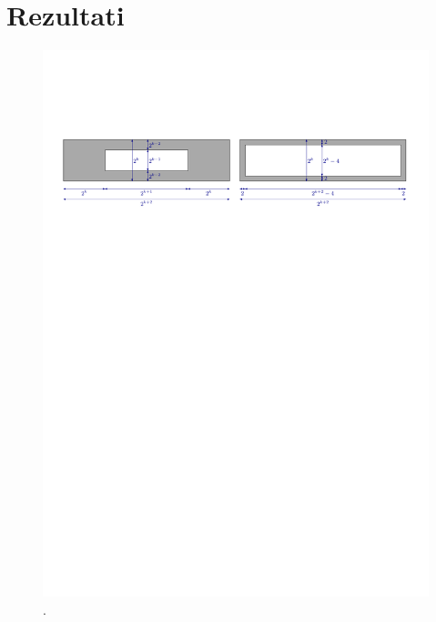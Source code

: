 \documentclass[a4paper, 12pt]{book}
\begin{document}
\chapter{Rezultati}
\label{ch3}

\begin{figure}
\centerline{\includegraphics[scale=0.75, page=1]{pics/data_generation.pdf}}
\caption{. }
\label{generation}
\end{figure}
\end{document}
